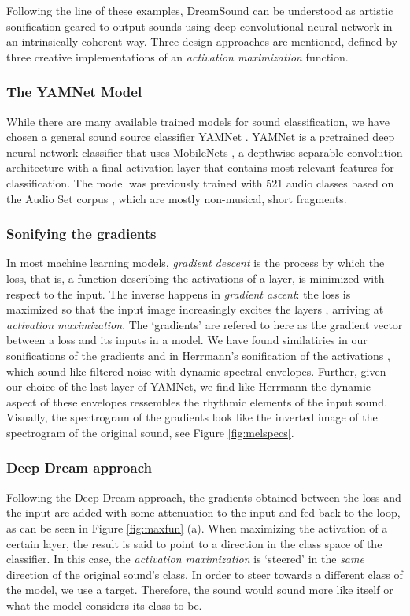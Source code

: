 \documentclass[a4paper,10pt,oneside]{article}
\begin{document}
\begin{sloppy}
Following the line of these examples, DreamSound can be understood as artistic sonification geared to output sounds using deep convolutional neural network in an intrinsically coherent way. Three design approaches are mentioned, defined by three creative implementations of an \textit{activation maximization} function.

\subsubsection{The YAMNet Model}
\label{subsec:yamnet}
While there are many available trained models for sound classification, we have chosen a general sound source classifier YAMNet \cite{YamNet2020}. YAMNet is a pretrained deep neural network classifier that uses MobileNets \cite{howard2017mobilenets}, a depthwise-separable convolution architecture with a final activation layer that contains most relevant features for classification. The model was previously trained with 521 audio classes based on the Audio  Set corpus \cite{2017audioset}, which are mostly non-musical, short fragments. 

\subsubsection{Sonifying the gradients}
\label{subsec:gradients}
In most machine learning models, \textit{gradient descent} is the process by which the loss, that is, a function describing the activations of a layer, is minimized with respect to the input. The inverse happens in \textit{gradient ascent}: the loss is maximized so that the input image increasingly excites the layers \cite{DeepDreamTutorial}, arriving at \textit{activation maximization}. The `gradients' are refered to here as the gradient vector between a loss and its inputs in a model. We have found similatiries in our sonifications of the gradients and in Herrmann's sonification of the activations \cite{pmlr-v123-herrmann20a}, which sound like filtered noise with dynamic spectral envelopes. Further, given our choice of the last layer of YAMNet, we find like Herrmann the dynamic aspect of these envelopes ressembles the rhythmic elements of the input sound. Visually, the spectrogram of the gradients look like the inverted image of the spectrogram of the original sound, see Figure \ref{fig:melspecs}.


\subsubsection{Deep Dream approach}
Following the Deep Dream approach, the gradients obtained between the loss and the input are added with some attenuation to the input and fed back to the loop, as can be seen in Figure \ref{fig:maxfun} (a). When maximizing the activation of a certain layer, the result is said to point to a direction in the class space of the classifier. In this case, the \textit{activation maximization} is `steered' in the \textit{same} direction of the original sound's class. In order to steer towards a different class of the model, we use a target. Therefore, the sound would sound more like itself or what the model considers its class to be. 


\end{sloppy}
\end{document}
